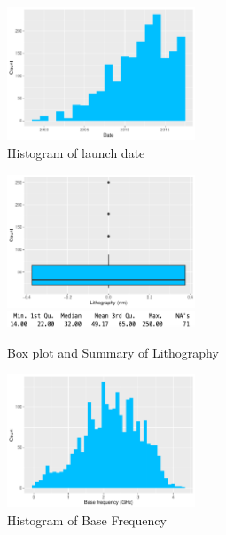 \begin{figure}[h!]
    \centering
    \includegraphics[width=0.5\textwidth]{./graphics/hist_ldate.pdf}
    \caption{Histogram of launch date}
\end{figure}

\begin{figure}[h!]
    \centering
    \includegraphics[width=0.5\textwidth]{./graphics/box_litho.pdf}
    \includegraphics[width=0.5\textwidth]{./graphics/sum_litho.png}
    \caption{Box plot and Summary of Lithography}
\end{figure}

\begin{figure}[h!]
    \centering
    \includegraphics[width=0.5\textwidth]{./graphics/hist_bfreq.pdf}
    \caption{Histogram of Base Frequency}
\end{figure}

